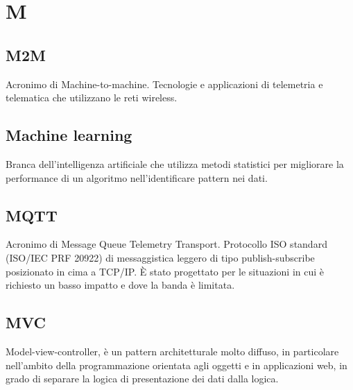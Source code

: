 \section*{M}
\markright{}
\subsection*{M2M}
Acronimo di Machine-to-machine. Tecnologie e applicazioni di telemetria e telematica che utilizzano le reti wireless.
\subsection*{Machine learning}
Branca dell'intelligenza artificiale che utilizza metodi statistici per migliorare la performance di un algoritmo nell'identificare pattern nei dati.
\subsection*{MQTT}
Acronimo di Message Queue Telemetry Transport. Protocollo ISO standard (ISO/IEC PRF 20922) di messaggistica leggero di tipo publish-subscribe posizionato in cima a TCP/IP. È stato progettato per le situazioni in cui è richiesto un basso impatto e dove la banda è limitata. 
\subsection*{MVC}
Model-view-controller, è un pattern architetturale molto diffuso, in particolare nell'ambito della programmazione orientata agli oggetti e in applicazioni web, in grado di separare la logica di presentazione dei dati dalla logica.